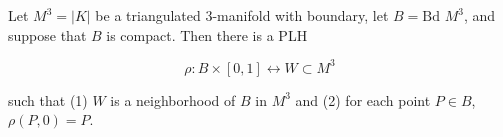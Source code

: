 Let $M^3 = |K|$ be a triangulated 3-manifold with boundary, let $B = \text{Bd } M^3$, and suppose that $B$ is compact. Then there is a PLH

$$\rho: B \times [0, 1] \leftrightarrow W \subset M^3$$

such that (1) $W$ is a neighborhood of $B$ in $M^3$ and (2) for each point $P \in B$, $\rho(P, 0) = P$.

